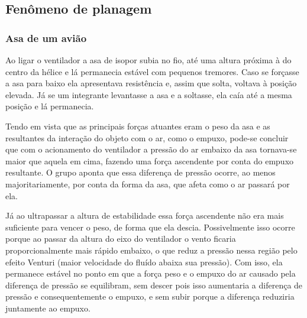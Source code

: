 \subsection{Fenômeno de planagem}
\subsubsection{Asa de um avião}
    Ao ligar o ventilador a asa de isopor subia no fio, até uma altura próxima à do
    centro da hélice e lá permanecia estável com pequenos tremores. Caso se forçasse
    a asa para baixo ela apresentava resistência e, assim que solta, voltava à
    posição elevada. Já se um integrante levantasse a asa e a soltasse, ela caía até
    a mesma posição e lá permanecia.

    Tendo em vista que as principais forças atuantes eram o peso da asa e as
    resultantes da interação do objeto com o ar, como o empuxo, pode-se concluir que
    com o acionamento do ventilador a pressão do ar embaixo da asa tornava-se maior
    que aquela em cima, fazendo uma força ascendente por conta do empuxo resultante.
    O grupo aponta que essa diferença de pressão ocorre, ao menos majoritariamente,
    por conta da forma da asa, que afeta como o ar passará por ela.

    Já ao ultrapassar a altura de estabilidade essa força ascendente não era mais
    suficiente para vencer o peso, de forma que ela descia. Possivelmente isso
    ocorre porque ao passar da altura do eixo do ventilador o vento ficaria
    proporcionalmente mais rápido embaixo, o que reduz a pressão nessa região pelo
    efeito Venturi (maior velocidade do fluído abaixa sua pressão). Com isso, ela
    permanece estável no ponto em que a força peso e o empuxo do ar causado pela
    diferença de pressão se equilibram, sem descer pois isso aumentaria a diferença
    de pressão e consequentemente o empuxo, e sem subir porque a diferença reduziria
    juntamente ao empuxo. 


